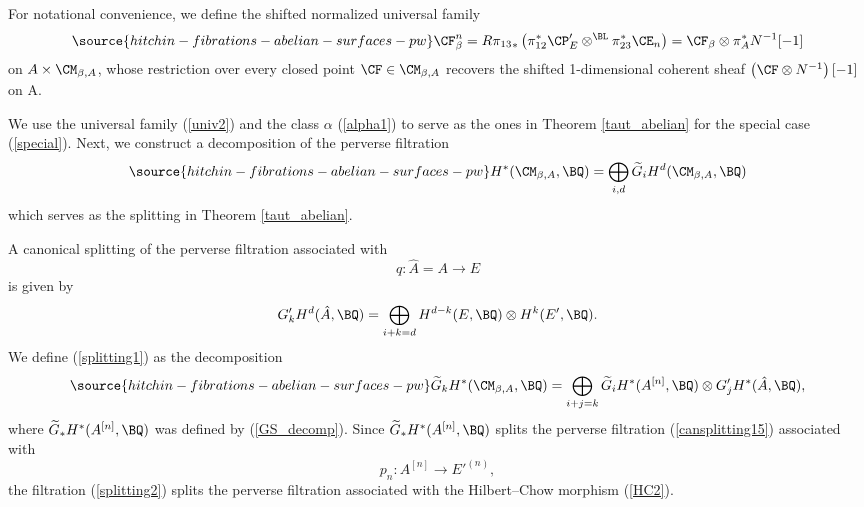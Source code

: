 For notational convenience, we define the shifted normalized universal family
\begin{equation}\label{Normalized_F}
\source{hitchin-fibrations-abelian-surfaces-pw}
\CF^{n}_\beta = {R\pi_{13}}_\ast \left( \pi_{12}^\ast {\CP'_{E}} \otimes^{\BL} \pi_{23}^\ast \CE_n \right) = \CF_\beta \otimes \pi_A^\ast N^{-1} [-1]
\end{equation}
on $A\times \CM_{\beta,A}$, whose restriction over every closed point $\CF \in \CM_{\beta,A}$ recovers the shifted 1-dimensional coherent sheaf $\left(\CF \otimes N^{-1}\right)[-1]$ on A.


We use the universal family (\ref{univ2}) {and the class $\alpha$ (\ref{alpha1})} to serve as the ones in Theorem \ref{taut_abelian} for the special case (\ref{special}). Next, we construct a decomposition of the perverse filtration
 \begin{equation}\label{splitting1}
\source{hitchin-fibrations-abelian-surfaces-pw}
H^\ast(\CM_{\beta, A}, \BQ) = \bigoplus_{i,d} \widetilde{G}_iH^d(\CM_{\beta, A}, \BQ)
\end{equation}
which serves as the splitting in Theorem \ref{taut_abelian}.

A canonical splitting of the perverse filtration associated with
\[
q: \hat{A} =A \to E
\]
is given by
\[
G'_kH^d(\hat{A}, \BQ) = \bigoplus_{i+k =d} H^{d-k}(E, \BQ)\otimes H^k(E',\BQ).
\]
We define (\ref{splitting1}) as the decomposition
\begin{equation}\label{splitting2}
\source{hitchin-fibrations-abelian-surfaces-pw}
\widetilde{G}_kH^\ast(\CM_{\beta, A}, \BQ) = \bigoplus_{i+j=k}  \widetilde{G}_i H^\ast(A^{[n]}, \BQ) \otimes G'_jH^\ast(\hat{A},\BQ),
\end{equation}
where
$\widetilde{G}_\ast H^\ast(A^{[n]}, \BQ)$ was defined by (\ref{GS_decomp}). Since $\widetilde{G}_\ast H^\ast(A^{[n]}, \BQ)$ splits the perverse filtration {(\ref{cansplitting15}) associated} with
\[
p_n:  A^{[n]} \to E'^{(n)},
\]
the filtration (\ref{splitting2}) splits the perverse filtration associated with the Hilbert--Chow morphism (\ref{HC2}).


